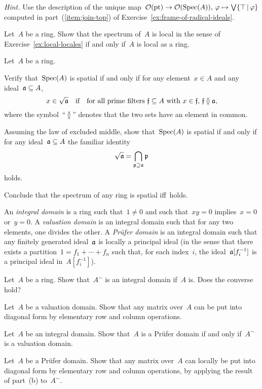 \documentclass{ws-rv9x6}
\begin{document}
{\begin{exercise}
{\noindent\scriptsize\emph{Hint.} Use the description of the unique map~$\mathcal{O}(\mathrm{pt}) \to
\mathcal{O}(\mathrm{Spec}(A)),\,\varphi \mapsto \bigvee\{\top\,|\,\varphi\}$ computed in
part~(\ref{item:join-top}) of Exercise~\ref{ex:frame-of-radical-ideals}.\par}
\end{exercise}

\begin{exercise}%
Let~$A$ be a ring. Show that the spectrum of~$A$ is local in the sense of
Exercise~\ref{ex:local-locales} if and only if~$A$ is local as a ring.
\end{exercise}

\begin{exercise}%
Let~$A$ be a ring.
\begin{alphlist}[(c)]
\item Verify that~$\mathrm{Spec}(A)$ is spatial if and only if for any element~$x \in
A$ and any ideal~$\mathfrak{a} \subseteq A$,
\[ x \in \sqrt{\mathfrak{a}} \quad\textnormal{if}\quad
\text{for all prime filters~$\mathfrak{f} \subseteq A$ with~$x \in \mathfrak{f}$, $\mathfrak{f} \between \mathfrak{a}$}, \]
where the symbol~``$\between$'' denotes that the two sets have an element in common.
\item Assuming the law of excluded middle, show that~$\mathrm{Spec}(A)$ is spatial if
and only if for any ideal~$\mathfrak{a} \subseteq A$ the familiar identity
\[ \sqrt{\mathfrak{a}} = \bigcap_{\mathfrak{p} \supseteq \mathfrak{a}} \mathfrak{p} \]
holds.
\item Conclude that the spectrum of any ring is spatial iff~\BPIT holds.
\end{alphlist}
\end{exercise}

\begin{exercise}%
An \emph{integral domain} is a ring such that~$1 \neq 0$ and such that~$xy = 0$
implies~$x = 0$ or~$y = 0$. A \emph{valuation domain} is an integral domain
such that for any two elements, one divides the other. A \emph{Prüfer domain}
is an integral domain such that any finitely generated ideal~$\mathfrak{a}$ is locally a
principal ideal (in the sense that there exists a partition~$1 = f_1 + \cdots +
f_n$ such that, for each index~$i$, the ideal~$\mathfrak{a}[f_i^{-1}]$ is a principal
ideal in~$A[f_i^{-1}]$).
\begin{alphlist}[(d)]
\item Let~$A$ be a ring. Show that~$A^\sim$ is an integral domain if~$A$ is.
Does the converse hold?
\item Let~$A$ be a valuation domain. Show that any matrix over~$A$ can be put
into diagonal form by elementary row and column operations.
\item Let~$A$ be an integral domain. Show that~$A$ is a Prüfer domain if and
only if~$A^\sim$ is a valuation domain.
\item Let~$A$ be a Prüfer domain. Show that any matrix over~$A$ can locally be
put into diagonal form by elementary row and column operations, by applying the
result of part~(b) to~$A^\sim$.
\end{alphlist}
\end{exercise}

}
\end{document}
